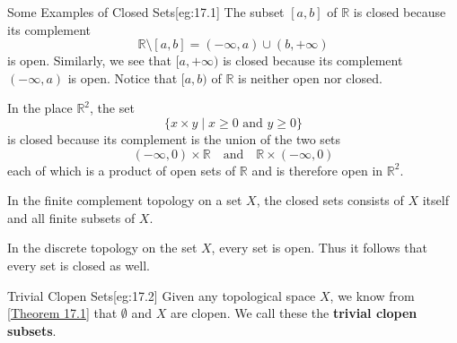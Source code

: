 \begin{egBox}{Some Examples of Closed Sets}[eg:17.1]
    The subset \( [ a, b ] \) of \( \mathbb{R} \) is closed because its 
    complement 
    \begin{equation*}
        \mathbb{R} \setminus [ a, b ]
        =
        ( - \infty, a ) \cup ( b, +\infty )
    \end{equation*}
    is open. 
    Similarly, we see that \( [ a, +\infty ) \) is closed because its 
    complement \( ( - \infty, a ) \) is open.
    Notice that \( [ a, b ) \) of \( \mathbb{R} \) is neither open nor 
    closed.

    \baseRule 

    In the place \( \mathbb{R}^{ 2 } \), the set 
    \begin{equation*}
        \{ x \times y \mid x \geq 0 \text{ and } y \geq 0 \}
    \end{equation*}
    is closed because its complement is the union of the two sets 
    \begin{equation*}
        ( -\infty, 0 ) \times \mathbb{R}
        \quad \mathrm{and} \quad
        \mathbb{R} \times ( - \infty, 0 )
    \end{equation*}
    each of which is a product of open sets of \( \mathbb{R} \) and is 
    therefore open in \( \mathbb{R}^{ 2 } \).

    \baseRule

    In the finite complement topology on a set \( X \), the closed sets consists
    of \( X \) itself and all finite subsets of \( X \).

    \baseRule

    In the discrete topology on the set \( X \), every set is open. 
    Thus it follows that every set is closed as well.
\end{egBox}

\begin{egBox}{Trivial Clopen Sets}[eg:17.2]
    Given any topological space \( X \), we know from [\hyperlink{thm:17-1}{Theorem 17.1}] that \( \emptyset \) and \( X \) are clopen. 
    We call these the \textbf{trivial clopen subsets}.
\end{egBox}


